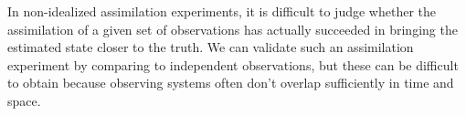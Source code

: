 In non-idealized assimilation experiments, it is difficult to judge whether the assimilation of a given set of observations has actually succeeded in bringing the estimated state closer to the truth.
We can validate such an assimilation experiment by comparing to independent observations, but these can be difficult to obtain because observing systems often don't overlap sufficiently in time and space.



